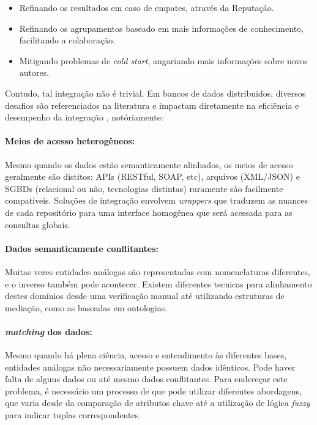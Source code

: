 \documentclass[sigconf]{acmart}
\begin{document}
\begin{itemize}
  \item Refinando os resultados em caso de empates, através da Reputação.

  \item Refinando os agrupamentos baseado em mais informações de conhecimento, facilitando a colaboração.

  \item Mitigando problemas de \textit{cold start}, angariando mais informações sobre novos autores.
\end{itemize}

Contudo, tal integração não é trivial. Em bancos de dados distribuidos, diversos desafios são referenciados na literatura e impactam diretamente na eficiência e desempenho da integração \cite{ozsu2011}, notóriamente:

\paragraph{Meios de acesso heterogêneos:} Mesmo quando os dados estão semanticamente alinhados, os meios de acesso geralmente são distitos: APIs (RESTful, SOAP, etc), arquivos (XML/JSON) e SGBDs (relacional ou não, tecnologias distintas) raramente são facilmente compatíveis. Soluções de integração envolvem \textit{wrappers} que traduzem as nuances de cada repositório para uma interface homogênea que será acessada para as consultas globais.

\paragraph{Dados semanticamente conflitantes:} Muitas vezes entidades análogas são representadas com nomenclaturas diferentes, e o inverso também pode acontecer. Existem diferentes tecnicas para alinhamento destes domínios desde uma  verificação manual até utilizando estruturas de mediação, como as baseadas em ontologias.

\paragraph{\textit{matching} dos dados:} Mesmo quando há plena ciência, acesso e entendimento às diferentes bases, entidades análogas não necessariamente possuem dados idênticos. Pode haver falta de alguns dados ou até mesmo dados conflitantes. Para endereçar este problema, é necessário um processo de  que pode utilizar diferentes abordagens, que varia desde da comparação de atributos chave até a utilização de lógica \textit{fuzzy} para indicar tuplas correspondentes.
\end{document}
